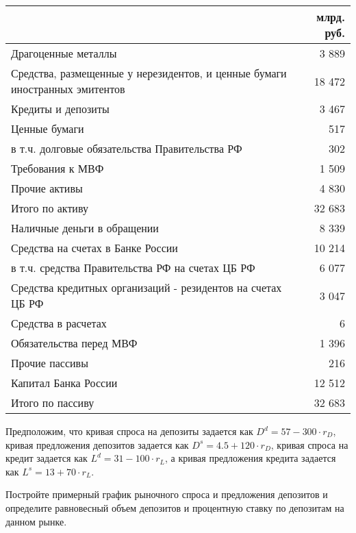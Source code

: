 \documentclass[12pt, table]{exam}
\begin{document}
\begin{questions}
\begin{solution}[12em]
	\small
	\begin{tabularx}{\linewidth}[b]{@{}>{\raggedright\arraybackslash}Xr@{}}		& млрд. руб.\\
		\toprule
	    Драгоценные металлы &               3 889    \\
		Средства, размещенные у нерезидентов, и ценные бумаги иностранных эмитентов &             18 472    \\
		Кредиты и депозиты &               3 467    \\
		Ценные бумаги &                  517    \\
		в т.ч. долговые обязательства Правительства РФ &                  302    \\
		Требования к МВФ &               1 509    \\
		Прочие активы &               4 830    \\
		Итого по активу &             32 683    \\
		\midrule
		Наличные деньги в обращении &               8 339    \\
		Средства на счетах в Банке России &             10 214    \\
		в т.ч. средства Правительства РФ на счетах ЦБ РФ &               6 077    \\
		Средства кредитных организаций - резидентов на счетах ЦБ РФ &               3 047    \\
		Средства в расчетах &                      6    \\
		Обязательства перед МВФ &               1 396    \\
		Прочие пассивы &                  216    \\
		Капитал Банка России &             12 512    \\
		Итого по пассиву &             32 683    \\
		\bottomrule
	\end{tabularx}%
	\normalsize
\end{solution}

\pagebreak
\question[15] Предположим, что кривая спроса на депозиты задается как 
$D^d = 57 - 300 \cdot r_D$, кривая предложения депозитов задается как 
$D^s = 4.5 + 120 \cdot r_D$, кривая спроса на кредит задается как 
$L^d = 31 - 100 \cdot r_L $, а кривая предложения кредита задается как 
$L^s= 13 + 70 \cdot r_L$.
\noaddpoints

\begin{subparts}
	\subpart[5] Постройте примерный график рыночного спроса и предложения депозитов и определите равновесный объем депозитов и процентную ставку по депозитам на данном рынке.
	

\end{subparts}
\end{questions}
\end{document}
